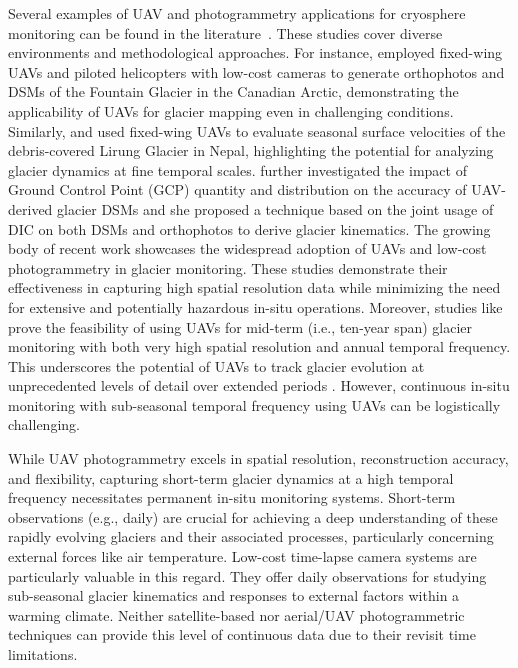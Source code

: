 Several examples of UAV and photogrammetry applications for cryosphere monitoring can be found in the literature~\citep{Bhardwaj2016, Gaffey2020}.
These studies cover diverse environments and methodological approaches.
For instance, \cite{Whitehead2013} employed fixed-wing UAVs and piloted helicopters with low-cost cameras to generate orthophotos and DSMs of the Fountain Glacier in the Canadian Arctic, demonstrating the applicability of UAVs for glacier mapping even in challenging conditions. 
Similarly, \cite{immerzeel2014} and \cite{kraaijenbrink2016} used fixed-wing UAVs to evaluate seasonal surface velocities of the debris-covered Lirung Glacier in Nepal, highlighting the potential for analyzing glacier dynamics at fine temporal scales.
\cite{Gindraux2017} further investigated the impact of Ground Control Point (GCP) quantity and distribution on the accuracy of UAV-derived glacier DSMs and she proposed a technique based on the joint usage of DIC on both DSMs and orthophotos to derive glacier kinematics.
The growing body of recent work \citep{Benoit2019, Chudley2019, Jouvet2020, Cao2021, Lamsters2022, belloni2023} showcases the widespread adoption of UAVs and low-cost photogrammetry in glacier monitoring. 
These studies demonstrate their effectiveness in capturing high spatial resolution data while minimizing the need for extensive and potentially hazardous in-situ operations. Moreover, studies like \cite{ioli2021mid} prove the feasibility of using UAVs for mid-term (i.e., ten-year span) glacier monitoring with both very high spatial resolution and annual temporal frequency. 
This underscores the potential of UAVs to track glacier evolution at unprecedented levels of detail over extended periods \citep{ioli2021mid, belloni2023}.
However, continuous in-situ monitoring with sub-seasonal temporal frequency using UAVs can be logistically challenging.

While UAV photogrammetry excels in spatial resolution, reconstruction accuracy, and flexibility, capturing short-term glacier dynamics at a high temporal frequency necessitates permanent in-situ monitoring systems. 
Short-term observations (e.g., daily) are crucial for achieving a deep understanding of these rapidly evolving glaciers and their associated processes, particularly concerning external forces like air temperature. 
Low-cost time-lapse camera systems are particularly valuable in this regard. 
They offer daily observations for studying sub-seasonal glacier kinematics and responses to external factors within a warming climate.  
Neither satellite-based nor aerial/UAV photogrammetric techniques can provide this level of continuous data due to their revisit time limitations.


